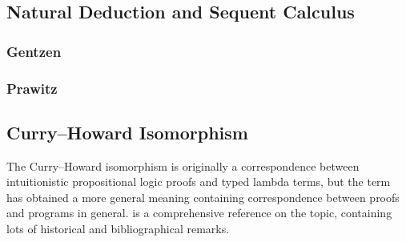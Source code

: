 \subsection{Natural Deduction and Sequent Calculus}

\subsubsection{Gentzen}


\subsubsection{Prawitz}



\subsection{Curry--Howard Isomorphism}

The Curry--Howard isomorphism is originally a correspondence between
intuitionistic propositional logic proofs and typed lambda terms, but
the term has obtained a more general meaning containing
correspondence between proofs and programs in general.
\citet{curryhoward} is a comprehensive reference on the topic,
containing lots of historical and bibliographical remarks.

